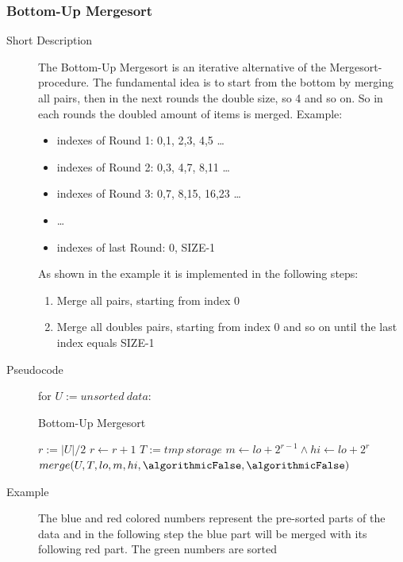 \documentclass[11pt]{amsart}
\begin{document}
\subsubsection{Bottom-Up Mergesort}
\begin{description}
	\item[Short Description] The Bottom-Up Mergesort is an iterative alternative of the Mergesort-procedure. The fundamental idea is to start from the bottom by merging all pairs, then in the next rounds the double size, so 4 and so on. So in each rounds the doubled amount of items is merged. Example:
		\begin{itemize}
			\item indexes of Round 1: 0,1, 2,3, 4,5 \ldots
			\item indexes of Round 2: 0,3, 4,7, 8,11 \ldots
			\item indexes of Round 3: 0,7, 8,15, 16,23 \ldots
			\item \ldots
			\item indexes of last Round: 0, SIZE-1 			
		\end{itemize}
As shown in the example it is implemented in the following steps:
		\begin{enumerate}
			\item Merge all pairs, starting from index 0
			\item Merge all doubles pairs, starting from index 0 and so on until the last index equals SIZE-1
		\end{enumerate}
	\item[Pseudocode] for $U := unsorted~data$:
	\begin{algorithm}
	\caption{Bottom-Up Mergesort}
		\begin{algorithmic}[1]
			\State $r := |U| / 2$
				\State $r \gets r + 1$ 
			\EndIf
			\State $T := tmp~storage$
				\State $m \gets lo+2^{r-1} \land hi \gets lo+2^{r}$
				\State $merge(U, T, lo, m, hi, \algorithmicFalse, \algorithmicFalse)$
			\EndFor
		\EndProcedure
		\end{algorithmic}
	\end{algorithm}	
	\newpage
	\item[Example] The {\color{blue}blue} and {\color{red}red} colored numbers represent the pre-sorted parts of the data and in the following step the blue part will be merged with its following red part. The {\color{green}green} numbers are sorted \\[.5cm]

\end{description}
\end{document}
